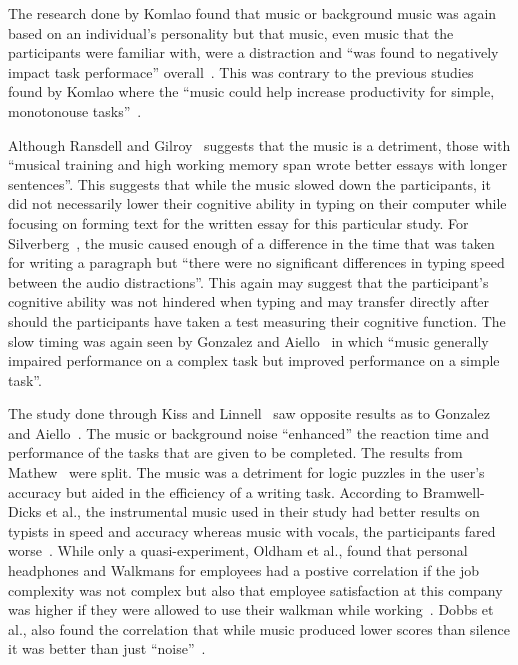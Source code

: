 \documentclass[manuscript, screen, review]{acmart} %
\begin{document}
The research done by Komlao found that music or background music was again based on an individual's personality but that music, even music that the participants were familiar with, were a distraction and ``was found to negatively impact task performace'' overall~\cite{komlao2018variations}.
This was contrary to the previous studies found by Komlao where the ``music could help increase productivity for simple, monotonouse tasks''~\cite{komlao2018variations}.

Although Ransdell and Gilroy~\cite{ransdell2001141} suggests that the music is a detriment, those with ``musical training and high working memory span wrote better essays with longer sentences''. 
This suggests that while the music slowed down the participants, it did not necessarily lower their cognitive ability in typing on their computer while focusing on forming text for the written essay for this particular study. 
For Silverberg~\cite{AudioDistractionsAshley}, the music caused enough of a difference in the time that was taken for writing a paragraph but ``there were no significant differences in typing speed between the audio distractions''. 
This again may suggest that the participant's cognitive ability was not hindered when typing and may transfer directly after should the participants have taken a test measuring their cognitive function. 
The slow timing was again seen by Gonzalez and Aiello~\cite{Gonzalez_Aiello_2019} in which ``music generally impaired performance on a complex task but improved performance on a simple task''. 

The study done through Kiss and Linnell~\cite{kiss2021effect} saw opposite results as to Gonzalez and Aiello~\cite{Gonzalez_Aiello_2019}. The music or background noise ``enhanced'' the reaction time and performance of the tasks that are given to be completed. 
The results from Mathew~\cite{mathew2022inherently} were split. 
The music was a detriment for logic puzzles in the user's accuracy but aided in the efficiency of a writing task. 
According to Bramwell-Dicks et al., the instrumental music used in their study had better results on typists in speed and accuracy whereas music with vocals, the participants fared worse~\cite{bramwell2016can}.
While only a quasi-experiment, Oldham et al., found that personal headphones and Walkmans for employees had a postive correlation if the job complexity was not complex but also that employee satisfaction at this company was higher if they were allowed to use their walkman while working~\cite{oldhamListen}. Dobbs et al., also found the correlation that while music produced lower scores than silence it was better than just ``noise''~\cite{effectsOfBackgroundDobbs}.
\end{document}
